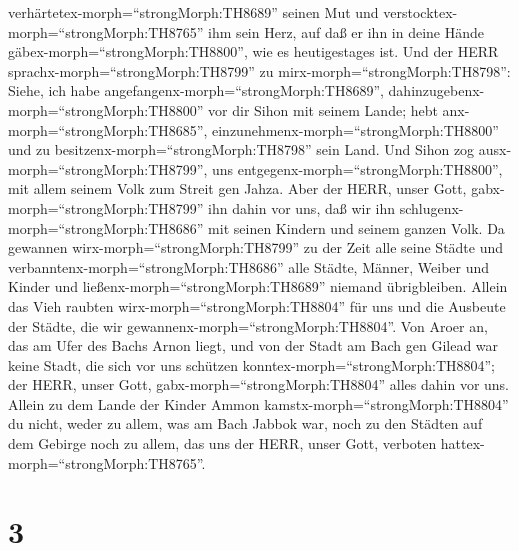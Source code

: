 verhärtetex-morph=``strongMorph:TH8689'' seinen Mut und
verstocktex-morph=``strongMorph:TH8765'' ihm sein Herz, auf daß er ihn
in deine Hände gäbex-morph=``strongMorph:TH8800'', wie es heutigestages
ist.  Und der HERR sprachx-morph=``strongMorph:TH8799'' zu
mirx-morph=``strongMorph:TH8798'': Siehe, ich habe
angefangenx-morph=``strongMorph:TH8689'',
dahinzugebenx-morph=``strongMorph:TH8800'' vor dir Sihon mit seinem
Lande; hebt anx-morph=``strongMorph:TH8685'',
einzunehmenx-morph=``strongMorph:TH8800'' und zu
besitzenx-morph=``strongMorph:TH8798'' sein Land.  Und
Sihon zog ausx-morph=``strongMorph:TH8799'', uns
entgegenx-morph=``strongMorph:TH8800'', mit allem seinem Volk zum Streit
gen Jahza.  Aber der HERR, unser Gott,
gabx-morph=``strongMorph:TH8799'' ihn dahin vor uns, daß wir ihn
schlugenx-morph=``strongMorph:TH8686'' mit seinen Kindern und seinem
ganzen Volk.  Da gewannen wirx-morph=``strongMorph:TH8799''
zu der Zeit alle seine Städte und
verbanntenx-morph=``strongMorph:TH8686'' alle Städte, Männer, Weiber und
Kinder und ließenx-morph=``strongMorph:TH8689'' niemand übrigbleiben.
 Allein das Vieh raubten wirx-morph=``strongMorph:TH8804''
für uns und die Ausbeute der Städte, die wir
gewannenx-morph=``strongMorph:TH8804''.  Von Aroer an, das
am Ufer des Bachs Arnon liegt, und von der Stadt am Bach gen Gilead war
keine Stadt, die sich vor uns schützen
konntex-morph=``strongMorph:TH8804''; der HERR, unser Gott,
gabx-morph=``strongMorph:TH8804'' alles dahin vor uns. 
Allein zu dem Lande der Kinder Ammon kamstx-morph=``strongMorph:TH8804''
du nicht, weder zu allem, was am Bach Jabbok war, noch zu den Städten
auf dem Gebirge noch zu allem, das uns der HERR, unser Gott, verboten
hattex-morph=``strongMorph:TH8765''.

\hypertarget{section-2}{%
\section{3}\label{section-2}}

